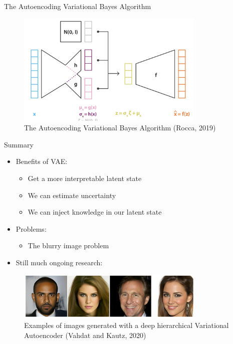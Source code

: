 \documentclass[10pt]{beamer}
\begin{document}
\begin{frame}{The Autoencoding Variational Bayes Algorithm}

\begin{figure}[h]
\centering
\includegraphics[width=0.8\textwidth]{fig/Rocca_VAE_full_reparmetr.png}
\caption{The Autoencoding Variational Bayes Algorithm (Rocca, 2019)}
\end{figure}

\end{frame}

\begin{frame}{Summary}

\begin{itemize}
\item Benefits of VAE:
\begin{itemize}
\item Get a more interpretable latent state
\item We can estimate uncertainty
\item We can inject knowledge in our latent state
\end{itemize}
\pause
\item Problems:
\begin{itemize}
\item The blurry image problem %
\end{itemize}
\pause
\item Still much ongoing research:
\end{itemize}

\begin{figure}[h]
\centering
\includegraphics[width=0.8\textwidth]{fig/Vahdat_Kautz_NVEA_2020.png}
\caption{Examples of images generated with a deep hierarchical Variational Autoencoder (Vahdat and Kautz, 2020)}
\end{figure}

\end{frame}
\end{document}
